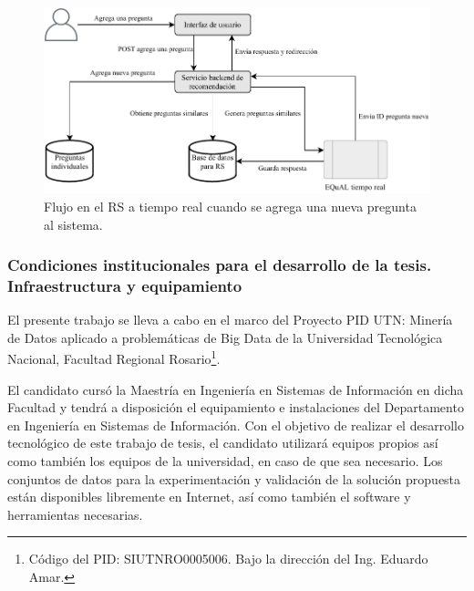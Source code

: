 \begin{figure}
	\centering
	\includegraphics[width=0.9\linewidth]{8_problema_investigacion/imagenes/implementacion_rs_agregar}
	\caption{Flujo en el RS a tiempo real cuando se agrega una nueva pregunta al sistema.}
	\label{fig:implementacionrsagregar}
\end{figure}

\subsubsection{Condiciones institucionales para el desarrollo de la tesis. Infraestructura y equipamiento}
El presente trabajo se lleva a cabo en el marco del Proyecto PID UTN: Minería de Datos aplicado a problemáticas de Big Data de la Universidad Tecnológica Nacional, Facultad Regional Rosario\footnote{Código del PID: SIUTNRO0005006. Bajo la dirección del Ing. Eduardo Amar.}.

\bigskip El candidato cursó la Maestría en Ingeniería en Sistemas de Información en dicha Facultad y tendrá a disposición el equipamiento e instalaciones del Departamento en Ingeniería en Sistemas de Información. Con el objetivo de realizar el desarrollo tecnológico de este trabajo de tesis, el candidato utilizará equipos propios así como también los equipos de la universidad, en caso de que sea necesario. Los conjuntos de datos para la experimentación y validación de la solución propuesta están disponibles libremente en Internet, así como también el software y herramientas necesarias.

















